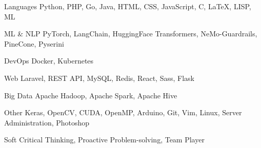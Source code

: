 

\begin{cvskills}

  \cvskill
    {Languages} %
    {Python, PHP, Go, Java, HTML, CSS, JavaScript, C, \LaTeX, LISP, ML} %

  \cvskill
    {ML \& NLP} %
    {PyTorch, LangChain, HuggingFace Transformers, NeMo-Guardrails, PineCone, Pyserini} %

  \cvskill
    {DevOps} %
    {Docker, Kubernetes} %

  \cvskill
    {Web} %
    {Laravel, REST API, MySQL, Redis, React, Sass, Flask} %

  \cvskill
    {Big Data} %
    {Apache Hadoop, Apache Spark, Apache Hive} %

  \cvskill
    {Other} %
    {Keras, OpenCV, CUDA, OpenMP, Arduino, Git, Vim, Linux, Server Administration, Photoshop} %

  \cvskill
    {Soft} %
    {Critical Thinking, Proactive Problem-solving, Team Player} %

\end{cvskills}
